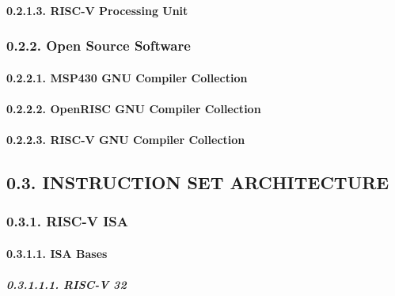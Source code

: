 \documentclass[
]{article}
\begin{document}
\hypertarget{risc-v-processing-unit-1}{%
\paragraph{0.2.1.3. RISC-V Processing
Unit}\label{risc-v-processing-unit-1}}

\hypertarget{open-source-software-1}{%
\subsubsection{0.2.2. Open Source
Software}\label{open-source-software-1}}

\hypertarget{msp430-gnu-compiler-collection-1}{%
\paragraph{0.2.2.1. MSP430 GNU Compiler
Collection}\label{msp430-gnu-compiler-collection-1}}

\hypertarget{openrisc-gnu-compiler-collection-1}{%
\paragraph{0.2.2.2. OpenRISC GNU Compiler
Collection}\label{openrisc-gnu-compiler-collection-1}}

\hypertarget{risc-v-gnu-compiler-collection-1}{%
\paragraph{0.2.2.3. RISC-V GNU Compiler
Collection}\label{risc-v-gnu-compiler-collection-1}}

\hypertarget{instruction-set-architecture-1}{%
\subsection{0.3. INSTRUCTION SET
ARCHITECTURE}\label{instruction-set-architecture-1}}

\hypertarget{risc-v-isa-1}{%
\subsubsection{0.3.1. RISC-V ISA}\label{risc-v-isa-1}}

\hypertarget{isa-bases-3}{%
\paragraph{0.3.1.1. ISA Bases}\label{isa-bases-3}}

\hypertarget{risc-v-32-1}{%
\subparagraph{0.3.1.1.1. RISC-V 32}\label{risc-v-32-1}}
\end{document}
